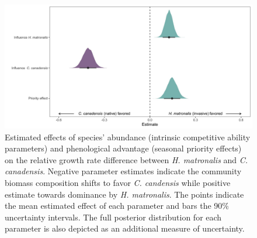 \documentclass{article}[11pt]
\begin{document}
\begin{figure}[h!]
    \centering
\includegraphics[width=\textwidth]{..//figure/mu_plots.jpeg}
    \caption{Estimated effects of species' abundance (intrinsic competitive ability parameters) and phenological advantage (seasonal priority effects) on the relative growth rate difference between \textit{H. matronalis} and \textit{C. canadensis}. Negative parameter estimates indicate the community biomass composition shifts to favor \textit{C. candensis} while positive estimate towards dominance by \textit{ H. matronalis}. The points indicate the mean estimated effect of each parameter and bars the 90\% uncertainty intervals. The full posterior distribution for each parameter is also depicted as an additional measure of uncertainty.} 
    \label{fig:RGRD}
\end{figure}

\end{document}
